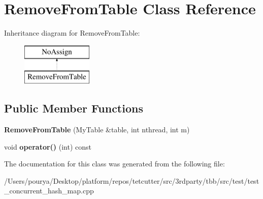 \hypertarget{classRemoveFromTable}{}\section{Remove\+From\+Table Class Reference}
\label{classRemoveFromTable}
Inheritance diagram for Remove\+From\+Table\+:\begin{figure}[H]
\begin{center}
\leavevmode
\includegraphics[height=2.000000cm]{classRemoveFromTable}
\end{center}
\end{figure}
\subsection*{Public Member Functions}
\begin{DoxyCompactItemize}
\item 
\hypertarget{classRemoveFromTable_adae56d5d4f6e98b3914457f4f521a502}{}{\bfseries Remove\+From\+Table} (My\+Table \&table, int nthread, int m)\label{classRemoveFromTable_adae56d5d4f6e98b3914457f4f521a502}

\item 
\hypertarget{classRemoveFromTable_a417d71ca82a327d25aa2e338ee0a6c0b}{}void {\bfseries operator()} (int) const \label{classRemoveFromTable_a417d71ca82a327d25aa2e338ee0a6c0b}

\end{DoxyCompactItemize}


The documentation for this class was generated from the following file\+:\begin{DoxyCompactItemize}
\item 
/\+Users/pourya/\+Desktop/platform/repos/tetcutter/src/3rdparty/tbb/src/test/test\+\_\+concurrent\+\_\+hash\+\_\+map.\+cpp\end{DoxyCompactItemize}
